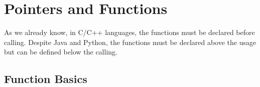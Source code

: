 \documentclass[12pt , a4paper]{article}
\begin{document}
\newpage
%
%
\section{Pointers and Functions}
As we already know, in C/C++ languages, the functions must be declared before calling. Despite Java and Python, the functions must be declared above the usage but can be defined below the calling.\\
	

	\subsection{Function Basics}
\end{document}
